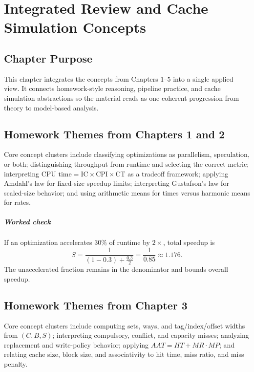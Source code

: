 \chapter{Integrated Review and Cache Simulation Concepts}\label{ch:auto-006}

\section{Chapter Purpose}\label{sec:auto-046}
This chapter integrates the concepts from Chapters 1--5 into a single applied view.
It connects homework-style reasoning, pipeline practice, and cache simulation abstractions so the material reads as one coherent progression from theory to model-based analysis.

\section{Homework Themes from Chapters 1 and 2}\label{sec:auto-047}
Core concept clusters include classifying optimizations as parallelism, speculation, or both; distinguishing throughput from runtime and selecting the correct metric; interpreting $\text{CPU time}=\text{IC}\times\text{CPI}\times\text{CT}$ as a tradeoff framework; applying Amdahl's law for fixed-size speedup limits; interpreting Gustafson's law for scaled-size behavior; and using arithmetic means for times versus harmonic means for rates.

\paragraph{Worked check}\label{par:auto-026}
If an optimization accelerates 30\% of runtime by $2\times$, total speedup is
\begin{equation}\label{eq:auto-045}
S=\frac{1}{(1-0.3)+\frac{0.3}{2}}=\frac{1}{0.85}\approx 1.176.
\end{equation}
The unaccelerated fraction remains in the denominator and bounds overall speedup.

\section{Homework Themes from Chapter 3}\label{sec:auto-048}
Core concept clusters include computing sets, ways, and tag/index/offset widths from $(C,B,S)$; interpreting compulsory, conflict, and capacity misses; analyzing replacement and write-policy behavior; applying $AAT=HT+MR\cdot MP$; and relating cache size, block size, and associativity to hit time, miss ratio, and miss penalty.

